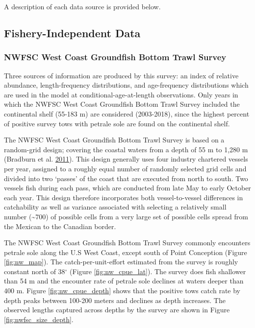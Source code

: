 \documentclass[12pt,]{article}
\begin{document}
A description of each data source is provided below.

\subsection{Fishery-Independent Data}\label{fishery-independent-data}

\subsubsection{NWFSC West Coast Groundfish Bottom Trawl
Survey}\label{nwfsc-west-coast-groundfish-bottom-trawl-survey}

Three sources of information are produced by this survey: an index of
relative abundance, length-frequency distributions, and age-frequency
distributions which are used in the model at conditional-age-at-length
observations. Only years in which the NWFSC West Coast Groundfish Bottom
Trawl Survey included the continental shelf (55-183 m) are considered
(2003-2018), since the highest percent of positive survey tows with
petrale sole are found on the continental shelf.

The NWFSC West Coast Groundfish Bottom Trawl Survey is based on a
random-grid design; covering the coastal waters from a depth of 55 m to
1,280 m (Bradburn et al.
\protect\hyperlink{ref-bradburn_2003_2011}{2011}). This design generally
uses four industry chartered vessels per year, assigned to a roughly
equal number of randomly selected grid cells and divided into two
`passes' of the coast that are executed from north to south. Two vessels
fish during each pass, which are conducted from late May to early
October each year. This design therefore incorporates both
vessel-to-vessel differences in catchability as well as variance
associated with selecting a relatively small number
(\textasciitilde{}700) of possible cells from a very large set of
possible cells spread from the Mexican to the Canadian border.

The NWFSC West Coast Groundfish Bottom Trawl Survey commonly encounters
petrale sole along the U.S West Coast, except south of Point Conception
(Figure \ref{fig:nw_map}). The catch-per-unit-effort estimated from the
survey is roughly constant north of 38\(^\circ\) (Figure
\ref{fig:nw_cpue_lat}). The survey does fish shallower than 54 m and the
encounter rate of petrale sole declines at waters deeper than 400 m.
Figure \ref{fig:nw_cpue_depth} shows that the positive tows catch rate
by depth peaks between 100-200 meters and declines as depth increases.
The observed lengths captured across depths by the survey are shown in
Figure \ref{fig:nwfsc_size_depth}.
\end{document}

